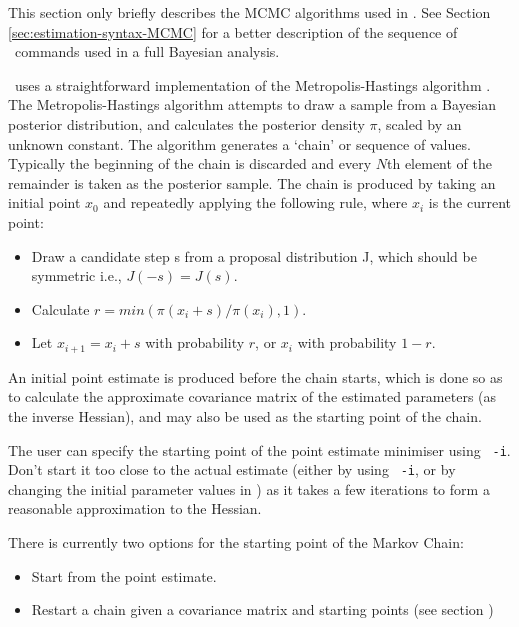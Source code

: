 This section only briefly describes the MCMC algorithms used in \CNAME. See Section \ref{sec:estimation-syntax-MCMC} for a better description of the sequence of \CNAME\ commands used in a full Bayesian analysis.

\CNAME\ uses a straightforward implementation of the Metropolis-Hastings algorithm \citep{823,143}. The Metropolis-Hastings algorithm attempts to draw a sample from a Bayesian posterior distribution, and calculates the posterior density $\pi$, scaled by an unknown constant. The algorithm generates a `chain' or sequence of values. Typically the beginning of the chain is discarded and every $N$th element of the remainder is taken as the posterior sample. The chain is produced by taking an initial point $x_0$ and repeatedly applying the following rule, where $x_i$ is the current point: 

\begin{itemize}
\item Draw a candidate step s from a proposal distribution J, which should be symmetric i.e., $J(-s)=J(s)$.
\item Calculate $r=min(\pi(x_i+s)/\pi(x_i),1)$. 
\item Let $x_{i+1}=x_i+s$ with probability $r$, or $x_i$ with probability $1-r$.
\end{itemize}

An initial point estimate is produced before the chain starts, which is done so as to calculate the approximate covariance matrix of the estimated parameters (as the inverse Hessian), and may also be used as the starting point of the chain. 

The user can specify the starting point of the point estimate minimiser using \texttt{\cname\ -i}. Don't start it too close to the actual estimate (either by using \texttt{\cname\ -i}, or by changing the initial parameter values in \config) as it takes a few iterations to form a reasonable approximation to the Hessian. 

There is currently two options for the starting point of the Markov Chain: 

\begin{itemize}
\item Start from the point estimate.
\item Restart a chain given a covariance matrix and starting points (see section ) 
\end{itemize}

